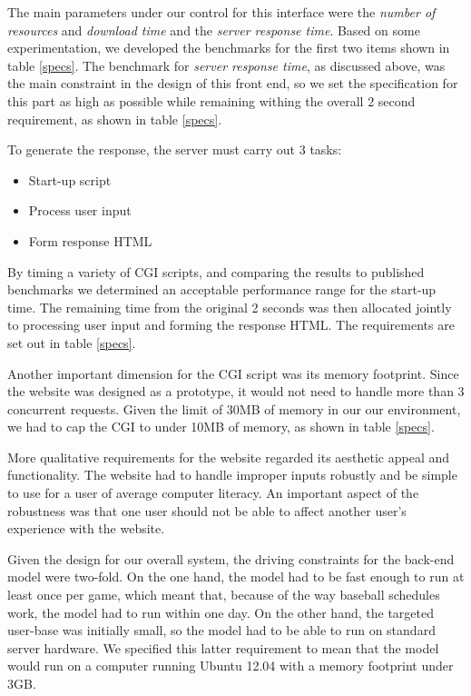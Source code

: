 The main parameters under our control for this interface were the
\emph{number of resources} and \emph{download time} and the \emph{server
  response time}. Based on some experimentation, we developed the
benchmarks for the first two items shown in table \ref{specs}. The
benchmark for \emph{server response time}, as discussed above, was the
main constraint in the design of this front end, so we set the
specification for this part as high as possible while remaining
withing the overall 2 second requirement, as shown in table
\ref{specs}.

To generate the response, the server must carry out 3 tasks:

\begin{itemize}
    \item Start-up script
    \item Process user input
    \item Form response HTML
\end{itemize}

By timing a variety of CGI scripts, and comparing the results to
published benchmarks\cite{cgi-benchmark} we determined an acceptable
performance range for the start-up time. The remaining time from the
original 2 seconds was then allocated jointly to processing user input
and forming the response HTML. The requirements are set out in table
\ref{specs}.

Another important dimension for the CGI script was its memory
footprint. Since the website was designed as a prototype, it would not
need to handle more than 3 concurrent requests. Given the limit of
30MB of memory in our our environment, we had to cap the CGI to under
10MB of memory, as shown in table \ref{specs}.

More qualitative requirements for the website regarded its aesthetic
appeal and functionality. The website had to handle improper inputs
robustly and be simple to use for a user of average computer literacy.
An important aspect of the robustness was that one user should not be
able to affect another user's experience with the website.

Given the design for our overall system, the driving constraints for
the back-end model were two-fold. On the one hand, the model had to be
fast enough to run at least once per game, which meant that, because
of the way baseball schedules work, the model had to run within one
day. On the other hand, the targeted user-base was initially small, so
the model had to be able to run on standard server hardware. We
specified this latter requirement to mean that the model would run on
a computer running Ubuntu 12.04 with a memory footprint under 3GB.

